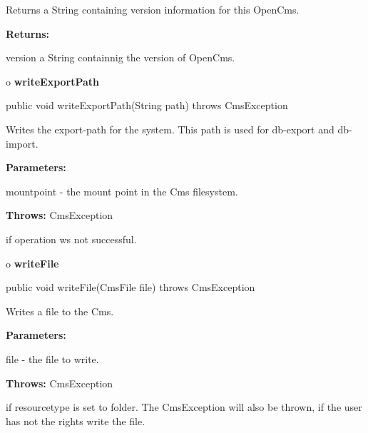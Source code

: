 \begin{description}
\htmlDD Returns a String containing version information for this OpenCms. 

\begin{description}
\item {\bf Returns:}  

version a String containnig the version of OpenCms.  
\end{description}

\end{description}

o {\bf writeExportPath} 

\begin{PRE}
 public void writeExportPath(String path) throws CmsException
\end{PRE}

\begin{description}
\htmlDD Writes the export-path for the system. \htmlBR
This path is used for db-export and db-import. 

\begin{description}
\item {\bf Parameters:}  

mountpoint - the mount point in the Cms filesystem.  
\item {\bf Throws:} CmsException  

if operation ws not successful.  
\end{description}

\end{description}

o {\bf writeFile} 

\begin{PRE}
 public void writeFile(CmsFile file) throws CmsException
\end{PRE}

\begin{description}
\htmlDD Writes a file to the Cms. 

\begin{description}
\item {\bf Parameters:}  

file - the file to write.  
\item {\bf Throws:} CmsException  

if resourcetype is set to folder. The CmsException will also be thrown, if the
user has not the rights write the file.  
\end{description}

\end{description}

